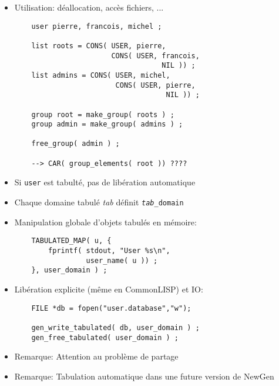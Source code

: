 \documentclass[11pt]{article}
\newcommand{\newgen}{NewGen}
\begin{document}
{\newpage

\vskip 2cm

\begin{itemize}
\item Utilisation: déallocation, accès fichiers, ...

\begin{verbatim}
    user pierre, francois, michel ;

    list roots = CONS( USER, pierre, 
                       CONS( USER, francois, 
                                   NIL )) ;
    list admins = CONS( USER, michel, 
                        CONS( USER, pierre, 
                                    NIL )) ;

    group root = make_group( roots ) ;
    group admin = make_group( admins ) ;

    free_group( admin ) ;

    --> CAR( group_elements( root )) ????
\end{verbatim}
\item Si {\tt user} est tabulté, pas de libération automatique
\end{itemize}

\newpage

\vskip 2cm

\begin{itemize}
\item Chaque domaine tabulé {\em tab} définit {\tt {\em tab}\_domain}
\item Manipulation globale d'objets tabulés en mémoire:

\begin{verbatim}
    TABULATED_MAP( u, {
        fprintf( stdout, "User %s\n", 
                 user_name( u )) ;
    }, user_domain ) ;
\end{verbatim}
\item Libération explicite (même en CommonLISP) et IO:

\begin{verbatim}
    FILE *db = fopen("user.database","w");

    gen_write_tabulated( db, user_domain ) ;
    gen_free_tabulated( user_domain ) ;
\end{verbatim}
\item Remarque: Attention au problème de partage
\item Remarque: Tabulation automatique dans une future version de \newgen
\end{itemize}

\newpage

}
\end{document}
